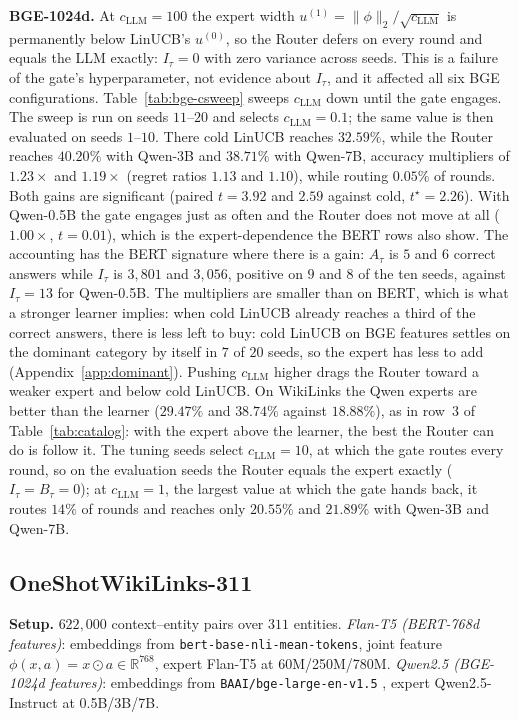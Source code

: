 \documentclass[anon]{alt2027} %
\begin{document}
\textbf{BGE-1024d.} At $c_{\mathrm{LLM}}=100$ the expert width $u^{(1)}=\|\phi\|_2/\sqrt{c_{\mathrm{LLM}}}$
is permanently below LinUCB's $u^{(0)}$, so the Router defers on every round
and equals the LLM exactly: $I_\tau=0$ with zero variance across seeds. This
is a failure of the gate's hyperparameter, not evidence about $I_\tau$, and it
affected all six BGE configurations. Table~\ref{tab:bge-csweep} sweeps $c_{\mathrm{LLM}}$
down until the gate engages. The sweep is run on seeds $11$--$20$ and selects
$c_{\mathrm{LLM}}=0.1$; the same value is then evaluated on seeds $1$--$10$. There cold LinUCB
reaches $32.59\%$, while the Router reaches $40.20\%$ with Qwen-3B and
$38.71\%$ with Qwen-7B, accuracy multipliers of $1.23\times$ and $1.19\times$
(regret ratios $1.13$ and $1.10$), while routing $0.05\%$ of rounds. Both gains
are significant (paired $t=3.92$ and $2.59$ against cold, $t^\star=2.26$). With
Qwen-0.5B the gate engages just as often and the Router does not move at all
($1.00\times$, $t=0.01$), which is the expert-dependence the BERT rows also
show. The accounting has the BERT signature where there is a gain: $A_\tau$ is
$5$ and $6$ correct answers while $I_\tau$ is $3{,}801$ and $3{,}056$, positive
on $9$ and $8$ of the ten seeds, against $I_\tau=13$ for Qwen-0.5B. The
multipliers are smaller than on BERT, which is what a stronger learner implies:
when cold LinUCB already reaches a third of the correct answers, there is less
left to buy: cold LinUCB on BGE features settles on the dominant category
by itself in $7$ of $20$ seeds, so the expert has less to add
(Appendix~\ref{app:dominant}). Pushing $c_{\mathrm{LLM}}$ higher
drags the Router toward a weaker expert and below cold LinUCB. On WikiLinks
the Qwen experts are better than the learner ($29.47\%$ and $38.74\%$ against
$18.88\%$), as in row~3 of Table~\ref{tab:catalog}: with the expert above the
learner, the best the Router can do is follow it. The tuning seeds select
$c_{\mathrm{LLM}}=10$, at which the gate routes every round, so on the evaluation
seeds the Router equals the expert exactly ($I_\tau=B_\tau=0$); at
$c_{\mathrm{LLM}}=1$, the largest value at which the gate hands back, it routes
$14\%$ of rounds and reaches only $20.55\%$ and $21.89\%$ with Qwen-3B and
Qwen-7B.

\subsection{OneShotWikiLinks-311}
\label{app:wiki}

\textbf{Setup.} $622{,}000$ context--entity pairs over $311$ entities.
\emph{Flan-T5 (BERT-768d features)}: embeddings from
\texttt{bert-base-nli-mean-tokens}, joint feature $\phi(x,a)=x\odot a\in\mathbb R^{768}$,
expert Flan-T5 \citep{chung2024scaling} at 60M/250M/780M.
\emph{Qwen2.5 (BGE-1024d features)}: embeddings from
\texttt{BAAI/bge-large-en-v1.5} \citep{xiao2024c}, expert Qwen2.5-Instruct
\citep{hui2024qwen2} at 0.5B/3B/7B.
\end{document}
